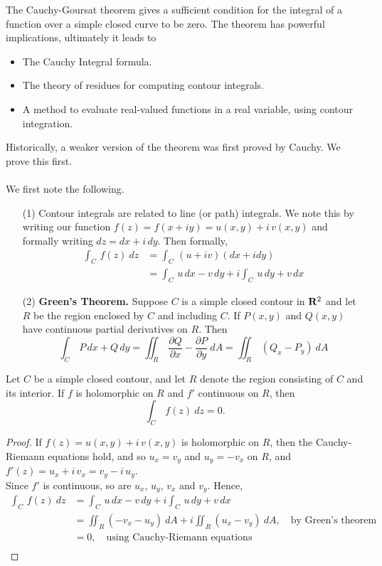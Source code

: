 \begin{discussion}
The Cauchy-Goursat theorem gives a sufficient condition for the integral of a function over a simple closed curve to be zero. The theorem has powerful implications, ultimately it leads to
\begin{itemize}
\item The Cauchy Integral formula.
\item The theory of residues for computing contour integrals.
\item A method to evaluate real-valued functions in a real variable, using contour integration.
\end{itemize}
Historically, a weaker version of the theorem was first proved by Cauchy. We prove this first.\\
\\
We first note the following.
\begin{itemize}
\item[(1)] Contour integrals are related to line (or path) integrals. We note this by writing our function $f(z) = f(x + iy) = u(x,y) + i\,v(x,y)$ and formally writing $dz = dx + i\,dy$. Then formally,
\begin{align*}
\int_C\,f(z)\ dz &= \int_C\, (u + iv)(dx + idy)\\[1em]
&= \int_C\, u\,dx - v\,dy + i\int_C\,u\,dy + v\,dx
\end{align*}

\item[(2)] \textbf{Green's Theorem.} Suppose $C$ is a simple closed contour in $\mathbf R^2$ and let $R$ be the region enclosed by $C$ and including $C$. If $P(x,y)$ and $Q(x,y)$ have continuous partial derivatives on $R$. Then
\[\int_C\,P\,dx + Q\,dy = \iint_R\,\frac{\partial Q}{\partial x} - \frac{\partial P}{\partial y}\ dA = \iint_R\,(Q_x - P_y)\ dA\]
\end{itemize}
\end{discussion}

\medskip

\begin{theorem}
Let $C$ be a simple closed contour, and let $R$ denote the region consisting of $C$ and its interior. If $f$ is holomorphic on $R$ and $f'$ continuous on $R$, then
\[\int_C\,f(z)\ dz = 0.\]
\end{theorem}
\begin{proof}
If $f(z) = u(x,y) + i\,v(x,y)$ is holomorphic on $R$, then the Cauchy-Riemann equations hold, and so $u_x = v_y$ and $u_y = -v_x$ on $R$, and $f'(z) = u_x + i\,v_x = v_y - i\,u_y$.\\[0.5em]
Since $f'$ is continuous, so are $u_x,\,u_y,\,v_x$ and $v_y$. Hence, 
\begin{align*}
\int_C\,f(z)\ dz &= \int_C\, u\,dx - v\,dy + i\int_C\,u\,dy + v\,dx\\[1em]
 &= \iint_R (-v_x-u_y)\ dA + i\iint_R (u_x - v_y)\ dA,\quad \text{by Green's theorem}\\[1em]
 &= 0,\quad \text{using Cauchy-Riemann equations}\\[-3em]
\end{align*}
\end{proof}

